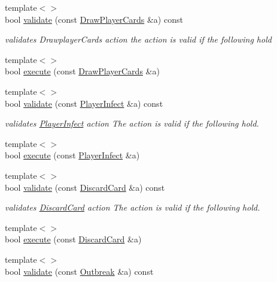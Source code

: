 \begin{DoxyCompactItemize}
\item 
{\footnotesize template$<$$>$ }\\bool \hyperlink{classpan_1_1_action_handler_a6e4ee30f39708e81fa435d13d3b27919}{validate} (const \hyperlink{classpan_1_1_draw_player_cards}{Draw\+Player\+Cards} \&a) const
\begin{DoxyCompactList}\small\item\em validates Drawplayer\+Cards action the action is valid if the following hold \end{DoxyCompactList}\item 
{\footnotesize template$<$$>$ }\\bool \hyperlink{classpan_1_1_action_handler_a1dbb4c4c6404625a9660d1d5f7b94dc5}{execute} (const \hyperlink{classpan_1_1_draw_player_cards}{Draw\+Player\+Cards} \&a)
\item 
{\footnotesize template$<$$>$ }\\bool \hyperlink{classpan_1_1_action_handler_af6d6407b345efff7c1d2ecb50a0af563}{validate} (const \hyperlink{classpan_1_1_player_infect}{Player\+Infect} \&a) const
\begin{DoxyCompactList}\small\item\em validates \hyperlink{classpan_1_1_player_infect}{Player\+Infect} action The action is valid if the following hold. \end{DoxyCompactList}\item 
{\footnotesize template$<$$>$ }\\bool \hyperlink{classpan_1_1_action_handler_a1ebea9d9a8bb894945e1ad0ecc7821c9}{execute} (const \hyperlink{classpan_1_1_player_infect}{Player\+Infect} \&a)
\item 
{\footnotesize template$<$$>$ }\\bool \hyperlink{classpan_1_1_action_handler_af6175819ceeba99896279c04401a5393}{validate} (const \hyperlink{classpan_1_1_discard_card}{Discard\+Card} \&a) const
\begin{DoxyCompactList}\small\item\em validates \hyperlink{classpan_1_1_discard_card}{Discard\+Card} action The action is valid if the following hold. \end{DoxyCompactList}\item 
{\footnotesize template$<$$>$ }\\bool \hyperlink{classpan_1_1_action_handler_a829a5d84e0fd082391be32ed3a680ae4}{execute} (const \hyperlink{classpan_1_1_discard_card}{Discard\+Card} \&a)
\item 
{\footnotesize template$<$$>$ }\\bool \hyperlink{classpan_1_1_action_handler_a628fc9ae167c2d421644a12e93b8137c}{validate} (const \hyperlink{classpan_1_1_outbreak}{Outbreak} \&a) const

\end{DoxyCompactItemize}

